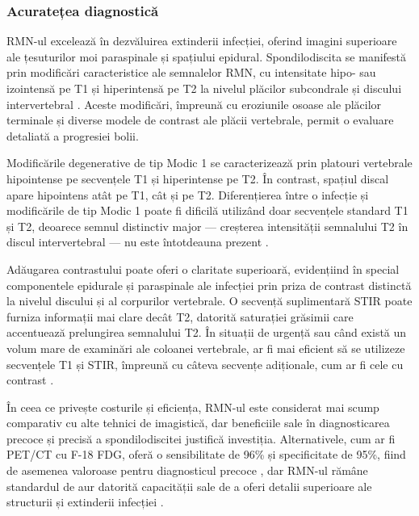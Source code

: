 \documentclass[romanian,12pt,a4paper]{article}
\begin{document}
\subsubsection{Acuratețea diagnostică}

RMN-ul excelează în dezvăluirea extinderii infecției, oferind imagini
superioare ale țesuturilor moi paraspinale și spațiului epidural.
Spondilodiscita se manifestă prin modificări caracteristice ale
semnalelor RMN, cu intensitate hipo- sau izointensă pe T1 și
hiperintensă pe T2 la nivelul plăcilor subcondrale și discului
intervertebral \cite{DiagnosticPerformanceMultiDetector2022}. Aceste
modificări, împreună cu eroziunile osoase ale plăcilor terminale și
diverse modele de contrast ale plăcii vertebrale, permit o evaluare
detaliată a progresiei bolii.

Modificările degenerative de tip Modic 1 se caracterizează prin platouri
vertebrale hipointense pe secvențele T1 și hiperintense pe T2. În
contrast, spațiul discal apare hipointens atât pe T1, cât și pe T2.
Diferențierea între o infecție și modificările de tip Modic 1 poate fi
dificilă utilizând doar secvențele standard T1 și T2, deoarece semnul
distinctiv major --- creșterea intensității semnalului T2 în discul
intervertebral --- nu este întotdeauna prezent
\cite{DegenerativeDiskDisease1988}.

Adăugarea contrastului poate oferi o claritate superioară, evidențiind
în special componentele epidurale și paraspinale ale infecției prin
priza de contrast distinctă la nivelul discului și al corpurilor
vertebrale. O secvență suplimentară STIR poate furniza informații mai
clare decât T2, datorită saturației grăsimii care accentuează
prelungirea semnalului T2. În situații de urgență sau când există un
volum mare de examinări ale coloanei vertebrale, ar fi mai eficient să
se utilizeze secvențele T1 și STIR, împreună cu câteva secvențe
adiționale, cum ar fi cele cu contrast
\cite{DiffusionweightedMRIClaw2014}.

În ceea ce privește costurile și eficiența, RMN-ul este considerat mai
scump comparativ cu alte tehnici de imagistică, dar beneficiile sale în
diagnosticarea precoce și precisă a spondilodiscitei justifică
investiția. Alternativele, cum ar fi PET/CT cu F-18 FDG, oferă o
sensibilitate de 96\% și specificitate de 95\%, fiind de asemenea
valoroase pentru diagnosticul precoce , dar RMN-ul rămâne standardul de
aur datorită capacității sale de a oferi detalii superioare ale
structurii și extinderii infecției \cite{ComparisonDiagnosticValue2017}.
\end{document}
